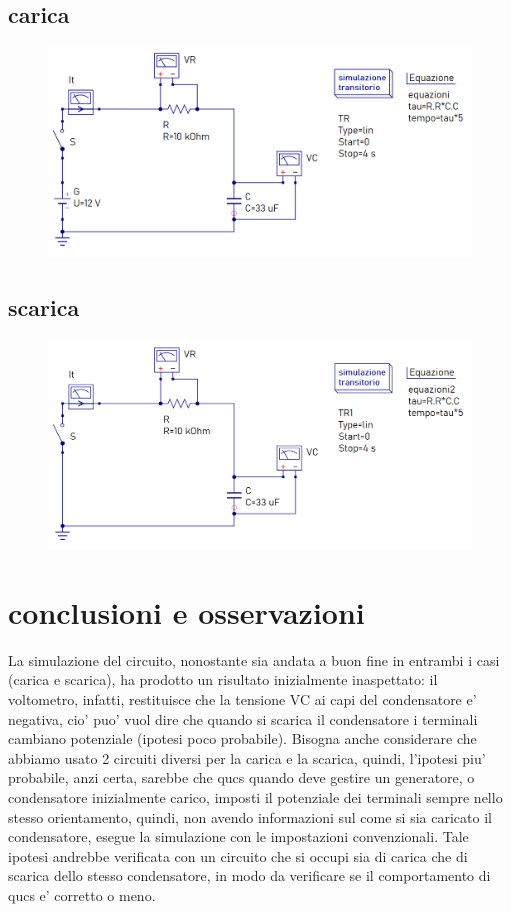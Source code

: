 \documentclass[12pt]{article}
\begin{document}
\subsection*{carica}

\begin{figure}[!h]
  \includegraphics[width=0.9\linewidth]{data/carica-simulazione-qucs.png}
\end{figure}

\subsection*{scarica}

\begin{figure}[!h]
  \includegraphics[width=0.9\linewidth]{data/scarica-simulazione-qucs.png}
\end{figure}

\newpage

\section*{conclusioni e osservazioni}
La simulazione del circuito, nonostante sia andata a buon fine in entrambi i casi (carica e scarica), ha prodotto un risultato inizialmente inaspettato: il voltometro, infatti, restituisce che la tensione VC ai capi del condensatore e' negativa, cio' puo' vuol dire che quando si scarica il condensatore i terminali cambiano potenziale (ipotesi poco probabile).
Bisogna anche considerare che abbiamo usato 2 circuiti diversi per la carica e la scarica, quindi, l'ipotesi piu' probabile, anzi certa, sarebbe che qucs quando deve gestire un generatore, o condensatore inizialmente carico, imposti il potenziale dei terminali sempre nello stesso orientamento, quindi, non avendo informazioni sul come si sia caricato il condensatore, esegue la simulazione con le impostazioni convenzionali. Tale ipotesi andrebbe verificata con un circuito che si occupi sia di carica che di scarica dello stesso condensatore, in modo da verificare se il comportamento di qucs e' corretto o meno.
\end{document}
